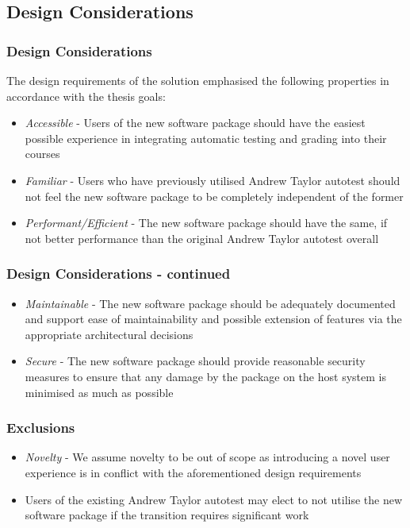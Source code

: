 \documentclass[xcolor, handout]{beamer}
\begin{document}
\subsection{Design Considerations}
\begin{frame}
	\frametitle{Design Considerations}
	The design requirements of the solution emphasised the following properties in accordance with the thesis goals:\\
	\begin{itemize}
		\setlength\itemsep{1em}
		\item \textit{Accessible} - Users of the new software package should have the easiest possible experience in integrating automatic testing and grading into their courses
			\pause
		\item \textit{Familiar} - Users who have previously utilised Andrew Taylor autotest should not feel the new software package to be completely independent of the former
			\pause
		\item \textit{Performant/Efficient} - The new software package should have the same, if not better performance than the original Andrew Taylor autotest overall
	\end{itemize}
\end{frame}
\begin{frame}
	\frametitle{Design Considerations - continued}
	\begin{itemize}
		\setlength\itemsep{1em}
		\item \textit{Maintainable} - The new software package should be adequately documented and support ease of maintainability and possible extension of features via the appropriate architectural decisions
			\pause
		\item \textit{Secure} - The new software package should provide reasonable security measures to ensure that any damage by the package on the host system is minimised as much as possible
	\end{itemize}
\end{frame}
\begin{frame}
	\frametitle{Exclusions}
	\begin{itemize}
		\setlength\itemsep{1em}
		\item \textit{Novelty} - We assume novelty to be out of scope as introducing a novel user experience is in conflict with the aforementioned design requirements
			\pause
		\item Users of the existing Andrew Taylor autotest may elect to not utilise the new software package if the transition requires significant work
	\end{itemize}
\end{frame}
\end{document}
